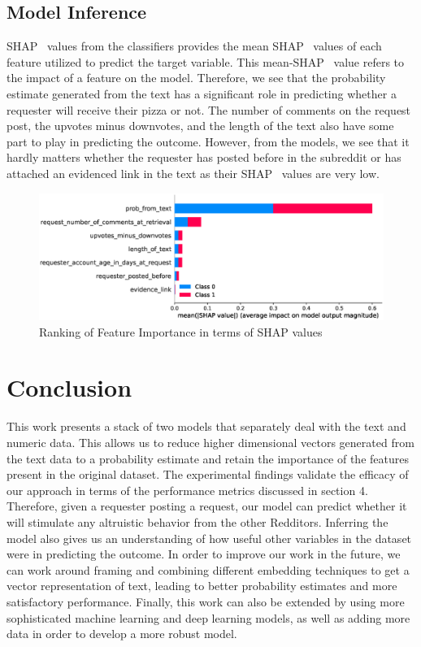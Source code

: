 \documentclass[runningheads]{llncs}
\begin{document}
\subsection{Model Inference}
 SHAP~\cite{shap} values from the classifiers provides the mean SHAP~\cite{shap} values of each feature utilized to predict the target variable. This mean-SHAP~\cite{shap} value refers to the impact of a feature on the model. Therefore, we see that the probability estimate generated from the text has a significant role in predicting whether a requester will receive their pizza or not. The number of comments on the request post, the upvotes minus downvotes, and the length of the text also have some part to play in predicting the outcome. However, from the models, we see that it hardly matters whether the requester has posted before in the subreddit or has attached an evidenced link in the text as their SHAP~\cite{shap} values are very low.
\begin{figure}
    \includegraphics[width=\linewidth]{FeatureImportanceShapley_minmax.eps}
    \caption{Ranking of Feature Importance in terms of SHAP values} \label{fig4}
\end{figure}

\section{Conclusion}
This work presents a stack of two models that separately deal with the text and numeric data. This allows us to reduce higher dimensional vectors generated from the text data to a probability estimate and retain the importance of the features present in the original dataset. The experimental findings validate the efficacy of our approach in terms of the performance metrics discussed in section 4. Therefore, given a requester posting a request, our model can predict whether it will stimulate any altruistic behavior from the other Redditors. Inferring the model also gives us an understanding of how useful other variables in the dataset were in predicting the outcome. In order to improve our work in the future, we can work around framing and combining different embedding techniques to get a vector representation of text, leading to better probability estimates and more satisfactory performance. Finally, this work can also be extended by using more sophisticated machine learning and deep learning models, as well as adding more data in order to develop a more robust model.
\end{document}
